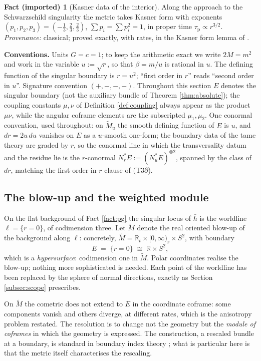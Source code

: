 \documentclass[11pt]{article}
\theoremstyle{definition}
\newtheorem{fact}[theorem]{Fact (imported)}
\newcommand{\R}{\mathbb{R}}
\newcommand{\Mt}{\widetilde{M}}
\newcommand{\hb}{\bar{h}}
\begin{document}
\begin{fact}[Kasner data of the interior]\label{fact:kasner}
Along the approach to the Schwarzschild singularity the metric takes Kasner form \cite{Kasner1921} with exponents $(p_1, p_2, p_3) = (-\tfrac13, \tfrac23, \tfrac23)$, $\sum p_i = \sum p_i^2 = 1$, in proper time $\tau_{\mathrm{p}} \propto r^{3/2}$. \emph{Provenance:} classical; proved exactly, with rates, in the Kasner form lemma of \cite{ButlerT6}.
\end{fact}

\noindent\textbf{Conventions.} Units $G = c = 1$; to keep the arithmetic exact we write $2M = m^2$ and work in the variable $u := \sqrt{r}$, so that $\beta = m/u$ is rational in $u$. The defining function of the singular boundary is $r = u^2$; ``first order in $r$'' reads ``second order in $u$''. Signature convention $({+},{-},{-},{-})$. Throughout this section $E$ denotes the singular boundary (not the auxiliary bundle of Theorem \ref{thm:absolute}); the coupling constants $\mu, \nu$ of Definition \ref{def:coupling} always appear as the product $\mu\nu$, while the angular coframe elements are the subscripted $\mu_1, \mu_2$. One conormal convention, used throughout: on $\Mt_u$ the smooth defining function of $E$ is $u$, and $dr = 2u\,du$ vanishes on $E$ as a $u$-smooth one-form; the boundary data of the tame theory are graded by $r$, so the conormal line in which the transversality datum and the residue lie is the $r$-conormal $N^*_r E := (N^*_u E)^{\otimes 2}$, spanned by the class of $dr$, matching the first-order-in-$r$ clause of (T3$\partial$).

\subsection{The blow-up and the weighted module}\label{subsec:schwblowup}

On the flat background of Fact \ref{fact:pg} the singular locus of $\hb$ is the worldline $\ell = \{r = 0\}$, of codimension three. Let $\Mt$ denote the real oriented blow-up of the background along $\ell$: concretely, $\Mt = \R_t \times [0,\infty)_r \times S^2$, with boundary
\[
E \;=\; \{r = 0\} \;\cong\; \R \times S^2 ,
\]
which is a \emph{hypersurface}: codimension one in $\Mt$. Polar coordinates realise the blow-up; nothing more sophisticated is needed. Each point of the worldline has been replaced by the sphere of normal directions, exactly as Section \ref{subsec:scope} prescribes.

On $\Mt$ the cometric does not extend to $E$ in the coordinate coframe: some components vanish and others diverge, at different rates, which is the anisotropy problem restated. The resolution is to change not the geometry but the \emph{module of coframes} in which the geometry is expressed. The construction, a rescaled bundle at a boundary, is standard in boundary index theory \cite{Melrose1993}; what is particular here is that the metric itself characterises the rescaling.
\end{document}
